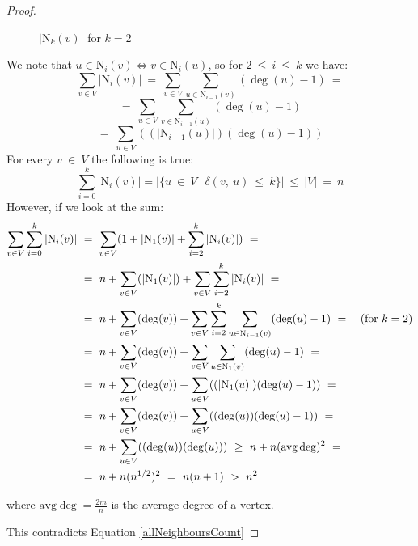 \documentclass[shortabstract, lic, english]{iithesis}
\theoremstyle{definition} \newtheorem{definition}{Definition}[chapter]
\theoremstyle{plain} \newtheorem{remark}[definition]{Observation}
\theoremstyle{plain} \newtheorem{theorem}[definition]{Theorem}
\theoremstyle{plain} \newtheorem{lemma}[definition]{Lemma}
\theoremstyle{plain} \newtheorem{conjecture}[definition]{Conjecture}
\begin{document}
\begin{proof}
\begin{figure}[h]
    \centering              
    \caption{$|$N$_{k}(v)|$ for $k = 2$}
    \end{figure}

    We note that $u\in $N$_i(v) \iff v \in $N$_i(u)$, so for $2~\leq~i~\leq~k$ we have:
    $$\sum_{v \in V}|\text{N}_i(v)|~=
    ~\sum_{v \in V}\sum_{u \in \text{N}_{i-1}(v)} (\deg(u) - 1)~=$$
    $$=~\sum_{u \in V}\sum_{v \in \text{N}_{i-1}(u)}(\deg(u) - 1)$$
    $$=~\sum_{u \in V}((|\text{N}_{i-1}(u)|)(\deg(u) - 1))$$
    For every $v~\in~V$ the following is true:
    \begin{equation}\label{allNeighboursCount}
    \sum_{i=0}^{k} |\text{N}_i(v)|=|\{u~\in~V~|~\delta(v,~u)~\leq~k\}|~\leq~|V|~=~n
    \end{equation}
    However, if we look at the sum:
    \begin{align}
        \sum_{v \in V}\sum_{i=0}^{k} |\text{N}_i(v)|~&=
        ~\sum_{v \in V}(1 + |\text{N}_1(v)| + \sum_{i=2}^{k} |\text{N}_i(v)|)~= \nonumber\\ 
        &=~n+\sum_{v \in V}(|\text{N}_1(v)|)+\sum_{v \in V}\sum_{i=2}^{k} |\text{N}_i(v)|~= \nonumber\\
        &=~n+\sum_{v \in V}(\deg(v))+\sum_{v \in V}\sum_{i=2}^{k}\sum_{u \in \text{N}_{i-1}(v)} (\deg(u) - 1)~=~~~(\textnormal{for}~k=2) \nonumber\\
        &=~n+\sum_{v \in V}(\deg(v))+\sum_{v \in V}\sum_{u \in \text{N}_1(v)} (\deg(u) -1)~= \nonumber\\
        &=~n+\sum_{v \in V}(\deg(v))+\sum_{u \in V}((|\text{N}_1(u)|)(\deg(u) -1))~= \nonumber\\
        &=~n+\sum_{v \in V}(\deg(v))+\sum_{u \in V}((\deg(u))(\deg(u) -1))~= \nonumber\\
        &=~n+\sum_{u \in V}((\deg(u))(\deg(u)))~\geq~n+n(\textnormal{avg}\deg)^2~= \nonumber\\
        &=~n+n(n^{1/2})^2~=~n(n+1)~>~n^2 \nonumber
    \end{align}

    where $\text{avg}\deg = \frac{2m}{n}$ is the average degree of a vertex.

    This contradicts Equation \ref{allNeighboursCount}
\end{proof}
\end{document}
